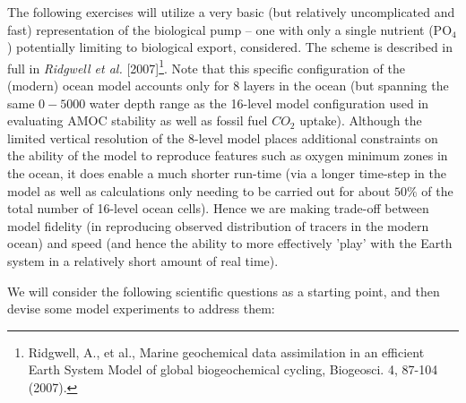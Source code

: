 The following exercises  will utilize a very basic (but relatively uncomplicated and fast) representation of the biological pump -- one with only a single nutrient (PO$_{4}$) potentially limiting to biological export, considered. The scheme is described in full in \textit{Ridgwell et al.} [2007]\footnote{Ridgwell, A., et al., Marine geochemical data assimilation in an efficient Earth System Model of global biogeochemical cycling, Biogeosci. 4, 87-104 (2007). }. Note that this specific configuration of the (modern) ocean model accounts only for 8 layers in the ocean (but spanning the same \(0-5000 \) water depth range as the 16-level model configuration used in evaluating AMOC stability as well as fossil fuel \(CO_{2}\) uptake). Although the limited vertical resolution of the 8-level model places additional constraints on the ability of the model to reproduce features such as oxygen minimum zones in the ocean, it does enable a much shorter run-time (via a longer time-step in the model as well as calculations only needing to be carried out for about \(50\%\) of the total number of 16-level ocean cells). Hence we are making  trade-off between model fidelity (in reproducing observed distribution of tracers in the modern ocean) and speed (and hence the ability to more effectively 'play' with the Earth system in a relatively short amount of real time).

\vspace{1mm}

We will consider the following scientific questions as a starting point, and then devise some model experiments to address them:

